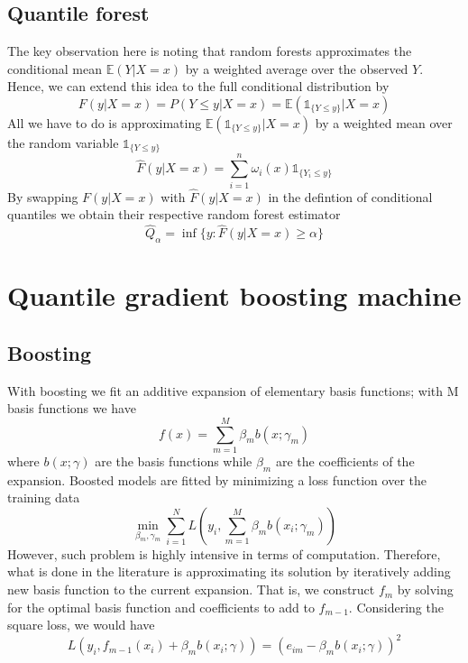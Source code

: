 \subsection{Quantile forest}
The key observation here is noting that random forests approximates the conditional mean $\mathbb{E}(Y|X=x)$ by a weighted average over the observed $Y$. Hence, we can extend this idea to the full conditional distribution by
\begin{equation}
    F(y|X=x)=P(Y\leq y|X=x)=\mathbb{E}(\mathbb{1}_{\{Y\leq y\}}|X=x)
\end{equation}
All we have to do is approximating $\mathbb{E}(\mathbb{1}_{\{Y\leq y\}}|X=x)$ by a weighted mean over the random variable $\mathbb{1}_{\{Y\leq y\}}$
\begin{equation}
    \hat{F}(y|X=x)=\sum\limits_{i=1}^{n}\omega_i(x)\mathbb{1}_{\{Y_i\leq y\}}
\end{equation}
By swapping $F(y|X=x)$ with $\hat{F}(y|X=x)$ in the defintion of conditional quantiles we obtain their respective random forest estimator
\begin{equation}
    \hat{Q}_\alpha=\inf\{y:\hat{F}(y|X=x)\geq \alpha\}
\end{equation}


\section{Quantile gradient boosting machine}
\subsection{Boosting}
With boosting we fit an additive expansion of elementary basis functions; with M basis functions we have 
\begin{equation}
    f(x)=\sum\limits_{m=1}^{M}\beta_m b(x;\gamma_m)
\end{equation}
where $b(x;\gamma)$ are the basis functions while $\beta_m$ are the coefficients of the expansion.
Boosted models are fitted by minimizing a loss function over the training data
\begin{equation}
    \min_{\beta_m, \gamma_m}\sum\limits_{i=1}^{N}L\left(y_i, \sum\limits_{m=1}^M \beta_m b(x_i;\gamma_m)\right)
\end{equation}
However, such problem is highly intensive in terms of computation. Therefore, what is done in the literature is approximating its solution by iteratively adding new basis function to the current expansion. That is, we construct $f_m$ by solving for the optimal basis function and coefficients to add to $f_{m-1}$. Considering the square loss, we would have
\begin{equation}
    L(y_i, f_{m-1}(x_i)+\beta_m b(x_i;\gamma))=(e_{im}-\beta_m b(x_i;\gamma))^2
\end{equation}

